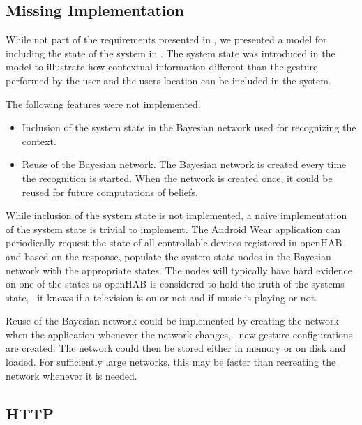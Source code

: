 \subsection{Missing Implementation}

While not part of the requirements presented in , we presented a model for including the state of the system in . The system state was introduced in the model to illustrate how contextual information different than the gesture performed by the user and the users location can be included in the system.

The following features were not implemented.

\begin{itemize}
\item Inclusion of the system state in the Bayesian network used for recognizing the context.
\item Reuse of the Bayesian network. The Bayesian network is created every time the recognition is started. When the network is created once, it could be reused for future computations of beliefs.
\end{itemize}

While inclusion of the system state is not implemented, a naive implementation of the system state is trivial to implement. The Android Wear application can periodically request the state of all controllable devices registered in openHAB and based on the response, populate the system state nodes in the Bayesian network with the appropriate states. The nodes will typically have hard evidence on one of the states as openHAB is considered to hold the truth of the systems state, \eg~it knows if a television is on or not and if music is playing or not.

Reuse of the Bayesian network could be implemented by creating the network when the application whenever the network changes, \ie~new gesture configurations are created. The network could then be stored either in memory or on disk and loaded. For sufficiently large networks, this may be faster than recreating the network whenever it is needed.

\subsection{HTTP}

